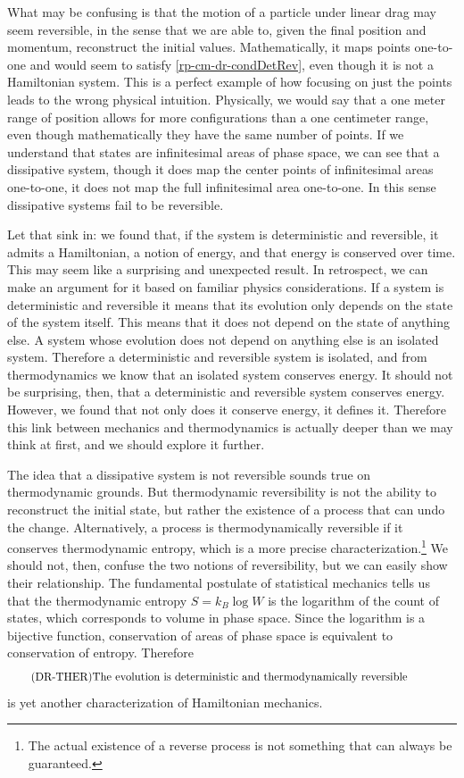 What may be confusing is that the motion of a particle under linear drag may seem reversible, in the sense that we are able to, given the final position and momentum, reconstruct the initial values. Mathematically, it maps points one-to-one and would seem to satisfy \ref{rp-cm-dr-condDetRev}, even though it is not a Hamiltonian system. This is a perfect example of how focusing on just the points leads to the wrong physical intuition. Physically, we would say that a one meter range of position allows for more configurations than a one centimeter range, even though mathematically they have the same number of points. If we understand that states are infinitesimal areas of phase space, we can see that a dissipative system, though it does map the center points of infinitesimal areas one-to-one, it does not map the full infinitesimal area one-to-one. In this sense dissipative systems fail to be reversible.

Let that sink in: we found that, if the system is deterministic and reversible, it admits a Hamiltonian, a notion of energy, and that energy is conserved over time. This may seem like a surprising and unexpected result. In retrospect, we can make an argument for it based on familiar physics considerations. If a system is deterministic and reversible it means that its evolution only depends on the state of the system itself. This means that it does not depend on the state of anything else. A system whose evolution does not depend on anything else is an isolated system. Therefore a deterministic and reversible system is isolated, and from thermodynamics we know that an isolated system conserves energy. It should not be surprising, then, that a deterministic and reversible system conserves energy. However, we found that not only does it conserve energy, it defines it. Therefore this link between mechanics and thermodynamics is actually deeper than we may think at first, and we should explore it further.

The idea that a dissipative system is not reversible sounds true on thermodynamic grounds. But thermodynamic reversibility is not the ability to reconstruct the initial state, but rather the existence of a process that can undo the change. Alternatively, a process is  thermodynamically reversible if it conserves thermodynamic entropy, which is a more precise characterization.\footnote{The actual existence of a reverse process is not something that can always be guaranteed.} We should not, then, confuse the two notions of reversibility, but we can easily show their relationship. The fundamental postulate of statistical mechanics tells us that the thermodynamic entropy $S = k_B \log W$ is the logarithm of the count of states, which corresponds to volume in phase space. Since the logarithm is a bijective function, conservation of areas of phase space is equivalent to conservation of entropy. Therefore
\begin{equation}\label{rp-cm-dr-condThermoRev}
	\tag{DR-THER}
	\eqtext{The evolution is deterministic and thermodynamically reversible}	
\end{equation}
is yet another characterization of Hamiltonian mechanics.

